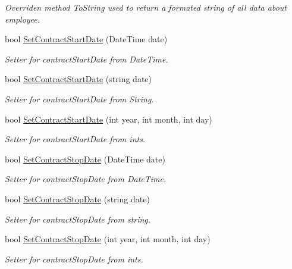 \begin{DoxyCompactItemize}
\begin{DoxyCompactList}\small\item\em Overriden method To\+String used to return a formated string of all data about employee. \end{DoxyCompactList}\item 
bool \hyperlink{class_all_employees_1_1_contract_employee_a012c48affde48858bda39a3cb9c802c4}{Set\+Contract\+Start\+Date} (Date\+Time date)
\begin{DoxyCompactList}\small\item\em Setter for contract\+Start\+Date from Date\+Time. \end{DoxyCompactList}\item 
bool \hyperlink{class_all_employees_1_1_contract_employee_aa10c777bc6b24385ceffaaff118e996e}{Set\+Contract\+Start\+Date} (string date)
\begin{DoxyCompactList}\small\item\em Setter for contract\+Start\+Date from String. \end{DoxyCompactList}\item 
bool \hyperlink{class_all_employees_1_1_contract_employee_af29121fe33b4f31b28eb545235a31331}{Set\+Contract\+Start\+Date} (int year, int month, int day)
\begin{DoxyCompactList}\small\item\em Setter for contract\+Start\+Date from ints. \end{DoxyCompactList}\item 
bool \hyperlink{class_all_employees_1_1_contract_employee_a60d9959aaf0368d3d951e00dc9b9276b}{Set\+Contract\+Stop\+Date} (Date\+Time date)
\begin{DoxyCompactList}\small\item\em Setter for contract\+Stop\+Date from Date\+Time. \end{DoxyCompactList}\item 
bool \hyperlink{class_all_employees_1_1_contract_employee_a5564f971606a6c44977001b3faef78d1}{Set\+Contract\+Stop\+Date} (string date)
\begin{DoxyCompactList}\small\item\em Setter for contract\+Stop\+Date from string. \end{DoxyCompactList}\item 
bool \hyperlink{class_all_employees_1_1_contract_employee_a3f7473cd491df8b2927333287b57a33d}{Set\+Contract\+Stop\+Date} (int year, int month, int day)
\begin{DoxyCompactList}\small\item\em Setter for contract\+Stop\+Date from ints. \end{DoxyCompactList}\item 

\end{DoxyCompactItemize}
